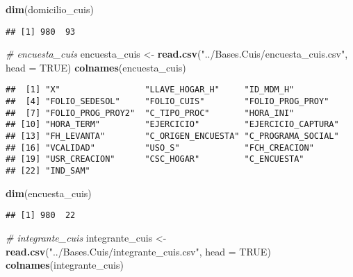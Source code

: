 \documentclass[11pt,]{article}
\newenvironment{Shaded}{\begin{snugshade}}{\end{snugshade}}
\newcommand{\KeywordTok}[1]{\textcolor[rgb]{0.13,0.29,0.53}{\textbf{#1}}}
\newcommand{\DataTypeTok}[1]{\textcolor[rgb]{0.13,0.29,0.53}{#1}}
\newcommand{\StringTok}[1]{\textcolor[rgb]{0.31,0.60,0.02}{#1}}
\newcommand{\CommentTok}[1]{\textcolor[rgb]{0.56,0.35,0.01}{\textit{#1}}}
\newcommand{\OtherTok}[1]{\textcolor[rgb]{0.56,0.35,0.01}{#1}}
\newcommand{\NormalTok}[1]{#1}
\begin{document}
\begin{Shaded}
\begin{Highlighting}[]
\KeywordTok{dim}\NormalTok{(domicilio_cuis)}
\end{Highlighting}
\end{Shaded}

\begin{verbatim}
## [1] 980  93
\end{verbatim}

\begin{Shaded}
\begin{Highlighting}[]
\CommentTok{# encuesta_cuis}
\NormalTok{encuesta_cuis <-}\StringTok{ }\KeywordTok{read.csv}\NormalTok{(}\StringTok{"../Bases.Cuis/encuesta_cuis.csv"}\NormalTok{, }\DataTypeTok{head =} \OtherTok{TRUE}\NormalTok{)}
\KeywordTok{colnames}\NormalTok{(encuesta_cuis)}
\end{Highlighting}
\end{Shaded}

\begin{verbatim}
##  [1] "X"                 "LLAVE_HOGAR_H"     "ID_MDM_H"         
##  [4] "FOLIO_SEDESOL"     "FOLIO_CUIS"        "FOLIO_PROG_PROY"  
##  [7] "FOLIO_PROG_PROY2"  "C_TIPO_PROC"       "HORA_INI"         
## [10] "HORA_TERM"         "EJERCICIO"         "EJERCICIO_CAPTURA"
## [13] "FH_LEVANTA"        "C_ORIGEN_ENCUESTA" "C_PROGRAMA_SOCIAL"
## [16] "VCALIDAD"          "USO_S"             "FCH_CREACION"     
## [19] "USR_CREACION"      "CSC_HOGAR"         "C_ENCUESTA"       
## [22] "IND_SAM"
\end{verbatim}

\begin{Shaded}
\begin{Highlighting}[]
\KeywordTok{dim}\NormalTok{(encuesta_cuis)}
\end{Highlighting}
\end{Shaded}

\begin{verbatim}
## [1] 980  22
\end{verbatim}

\begin{Shaded}
\begin{Highlighting}[]
\CommentTok{# integrante_cuis}
\NormalTok{integrante_cuis <-}\StringTok{ }\KeywordTok{read.csv}\NormalTok{(}\StringTok{"../Bases.Cuis/integrante_cuis.csv"}\NormalTok{, }\DataTypeTok{head =} \OtherTok{TRUE}\NormalTok{)}
\KeywordTok{colnames}\NormalTok{(integrante_cuis)}
\end{Highlighting}
\end{Shaded}
\end{document}
